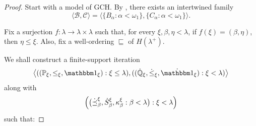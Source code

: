 \begin{proof}
Start with a model of GCH.  By \cite[Lemma~2.5]{brendle1999dow}, there exists an
intertwined family
\[
  \langle\mathcal B,\mathcal C\rangle
  =\langle\{B_\alpha:\alpha<\omega_1\},
           \{C_\alpha:\alpha<\omega_1\}\rangle.
\]

Fix a surjection $f:\lambda\to\lambda\times\lambda$ such that, for every
$\xi, \beta, \eta<\lambda$, if $f(\xi)=(\beta,\eta)$, then $\eta\leq\xi$.
Also, fix a well-ordering $\sqsubseteq$ of $H(\lambda^+)$.

We shall construct a finite-support iteration
\[
  \bigl\langle((\mathbb P_\xi, \leq_\xi, \mathbbm 1_\xi):\xi\leq\lambda),
  ((\dot{\mathbb Q}_\xi, \dot{\leq}_\xi, \dot{\mathbbm 1}_\xi):\xi<\lambda)\bigr\rangle
\]
along with
\[
  \Bigl(\bigl(\dot{\preceq}^\xi_\beta,\dot S^\xi_\beta,\kappa^\xi_\beta:\beta<\lambda\bigr):\xi<\lambda\Bigr)
\]
such that:


\end{proof}
